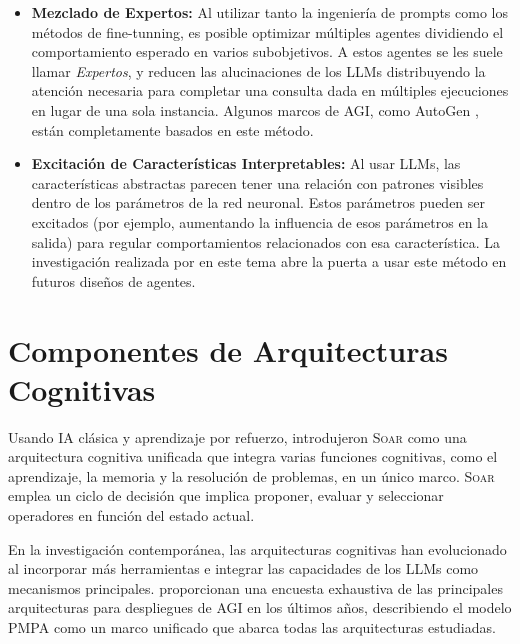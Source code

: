 \begin{itemize}
\item \textbf{Mezclado de Expertos:} Al utilizar tanto la ingeniería de prompts como los
    métodos de fine-tunning, es posible optimizar múltiples agentes dividiendo el
    comportamiento esperado en varios subobjetivos. A estos agentes se les suele
    llamar \textit{Expertos}, y reducen las alucinaciones de los LLMs distribuyendo
    la atención necesaria para completar una consulta dada en múltiples ejecuciones
    en lugar de una sola instancia. Algunos marcos de AGI, como AutoGen
    \cite{wu2023autogen}, están completamente basados en este método.

\item \textbf{Excitación de Características Interpretables:} Al usar LLMs, las
    características abstractas parecen tener una relación con patrones visibles
    dentro de los parámetros de la red neuronal. Estos parámetros pueden ser
    excitados (por ejemplo, aumentando la influencia de esos parámetros en la
    salida) para regular comportamientos relacionados con esa característica. La
    investigación realizada por \cite{viteri2024scaling} en este tema abre la puerta
    a usar este método en futuros diseños de agentes.  \end{itemize}


\section{Componentes de Arquitecturas Cognitivas}
\label{sec:components_of_cognitive_architectures}

Usando IA clásica y aprendizaje por refuerzo, \citet{laird2019soar} introdujeron
\textsc{Soar} como una arquitectura cognitiva unificada que integra varias
funciones cognitivas, como el aprendizaje, la memoria y la resolución de
problemas, en un único marco. \textsc{Soar} emplea un ciclo de decisión que
implica proponer, evaluar y seleccionar operadores en función del estado actual.

En la investigación contemporánea, las arquitecturas cognitivas han evolucionado
al incorporar más herramientas e integrar las capacidades de los LLMs como
mecanismos principales. \citet{wang2024survey} proporcionan una encuesta
exhaustiva de las principales arquitecturas para despliegues de AGI en los
últimos años, describiendo el modelo \textsc{PMPA} como un marco unificado que
abarca todas las arquitecturas estudiadas.


